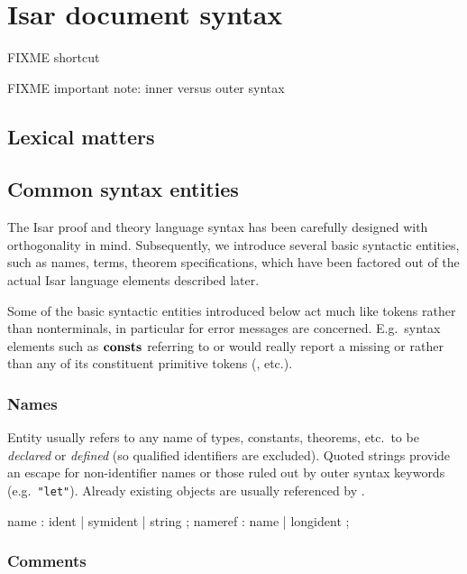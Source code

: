 


\chapter{Isar document syntax}

FIXME shortcut

FIXME important note: inner versus outer syntax

\section{Lexical matters}

\section{Common syntax entities}

The Isar proof and theory language syntax has been carefully designed with
orthogonality in mind.  Subsequently, we introduce several basic syntactic
entities, such as names, terms, theorem specifications, which have been
factored out of the actual Isar language elements described later.

Some of the basic syntactic entities introduced below act much like tokens
rather than nonterminals, in particular for error messages are concerned.
E.g.\ syntax elements such as ${\mathord{\mathbf{consts}}}$ referring to  or
 would really report a missing  or
 rather than any of its constituent primitive tokens
(,  etc.).


\subsection{Names}

Entity  usually refers to any name of types, constants,
theorems, etc.\ to be \emph{declared} or \emph{defined} (so qualified
identifiers are excluded).  Quoted strings provide an escape for
non-identifier names or those ruled out by outer syntax keywords (e.g.\ 
\verb|"let"|).  Already existing objects are usually referenced by
\railqtoken{nameref}.

\begin{rail}
  name : ident | symident | string
  ;
  nameref : name | longident
  ;
\end{rail}


\subsection{Comments}


